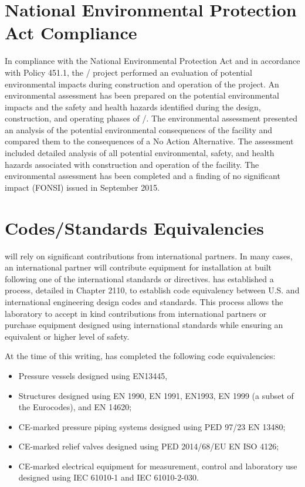 \section{National Environmental Protection Act Compliance}

In compliance with the National Environmental Protection Act and in
accordance with  Policy 451.1, the
/ project performed an evaluation of potential
environmental impacts during construction and operation of the
project.  An environmental assessment has been prepared on the
potential environmental impacts and the safety and health hazards
identified during the design, construction, and operating phases of
/.  The environmental assessment presented an
analysis of the potential environmental consequences of the facility
and compared them to the consequences of a No Action Alternative. The
assessment included detailed analysis of all potential environmental,
safety, and health hazards associated with construction and operation
of the facility.  The environmental assessment has been completed and
a finding of no significant impact (FONSI) issued in September 2015.

\section{Codes/Standards Equivalencies}
\label{sec:esh_codes}

 will rely on significant contributions from international
partners. In many cases, an international partner will contribute
equipment for installation at \fnal built following one of the
international standards or directives. \fnal has established a
process, detailed in  Chapter 2110, to establish code
equivalency between U.S. and international engineering design codes
and standards. This process allows the laboratory to accept in kind
contributions from international partners or purchase equipment
designed using international standards while ensuring an equivalent or
higher level of safety.

At the time of this writing, \fnal has completed the following code
equivalencies:
\begin{itemize}
 \item Pressure vessels designed using EN13445,
 \item Structures designed using EN 1990, EN 1991, EN1993, EN 1999 (a
   subset of the Eurocodes), and EN 14620;
 \item CE-marked pressure piping systems designed using PED 97/23 EN 13480;
 \item CE-marked relief valves designed using PED 2014/68/EU EN ISO 4126;
 \item CE-marked electrical equipment for measurement, control and
   laboratory use designed using IEC 61010-1 and IEC 61010-2-030.
\end{itemize}


